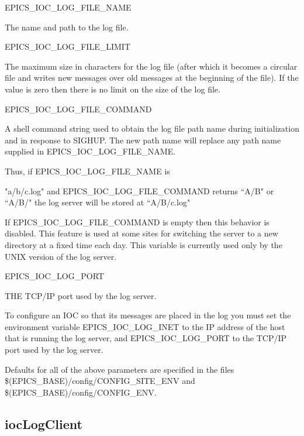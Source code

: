\begin{description}

\item {}EPICS\_IOC\_LOG\_FILE\_NAME 

The name and path to the log file.

\item {}EPICS\_IOC\_LOG\_FILE\_LIMIT

The maximum size in characters for the log file (after which it becomes a circular file and writes new 
messages over old  messages at the beginning of the file). If the value is zero then there is no limit on the 
size of the log file. 

\item {}EPICS\_IOC\_LOG\_FILE\_COMMAND

A shell command string used to obtain the log file path name during initialization and in response to 
SIGHUP. The new path name will replace any path name supplied in EPICS\_IOC\_LOG\_FILE\_NAME.

Thus, if EPICS\_IOC\_LOG\_FILE\_NAME is 

"a/b/c.log" and EPICS\_IOC\_LOG\_FILE\_COMMAND returns ``A/B" or ``A/B/" the log server will be stored 
at ``A/B/c.log"

If EPICS\_IOC\_LOG\_FILE\_COMMAND is empty then this behavior is disabled. This feature is used at 
some sites for switching the server to a new directory at a fixed time each day. This variable is currently 
used only by the UNIX version of the log server.

\item {}EPICS\_IOC\_LOG\_PORT

THE TCP/IP port used by the log server.

\end{description}

To configure an IOC so that its messages are placed in the log you must set the environment variable 
EPICS\_IOC\_LOG\_INET to the IP address of the host that is running the log server, and EPICS\_IOC\_LOG\_PORT to the 
TCP/IP port used by the log server.

Defaults for all of the above parameters are specified in  the files \$(EPICS\_BASE)/config/CONFIG\_SITE\_ENV and 
\$(EPICS\_BASE)/config/CONFIG\_ENV.

\subsection{iocLogClient}

